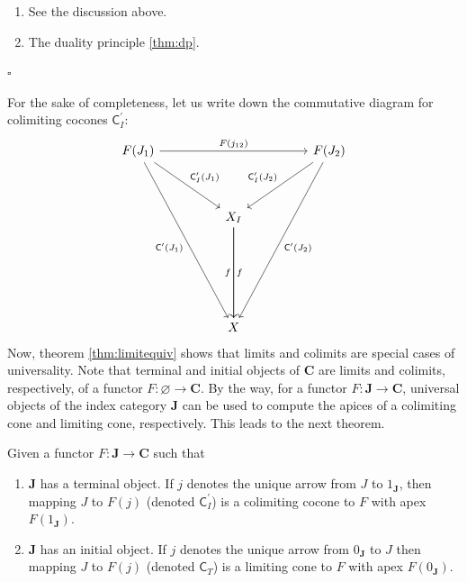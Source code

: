 \begin{prf}
\begin{enumerate}
\item[(1T)]
See the discussion above.
\item[(1I)]
The duality principle \ref{thm:dp}.
\end{enumerate}
\phantom{proven}
\hfill
$\square$
\end{prf}
For the sake of completeness, let us write down the commutative diagram for colimiting cocones $\mathsf{C}_{I}^{\prime}$:
\[
\begin{tikzcd}[sep=huge]
  F(J_{1})
  \arrow{rr}{F(j_{12})}
  \arrow{dr}{\mathsf{C}_{I}^{\prime}(J_{1})}
  \arrow[swap]{dddr}{\mathsf{C}^{\prime}(J_{1})}
  &
  &
  F(J_{2})
  \arrow{dddl}{\mathsf{C}^{\prime}(J_{2})}
  \arrow[swap]{dl}{\mathsf{C}_{I}^{\prime}(J_{2})}
  \\
  &
  X_{I}
  \arrow{dd}{f}
  \arrow[swap]{dd}{f}
  &
  \\
  \\
  &
  X
  &
\end{tikzcd}
\]
Now, theorem \ref{thm:limitequiv} shows that limits and colimits are special cases of universality.
Note that terminal and initial objects of $\mathbf{C}$ are limits and colimits, respectively, of a functor $F \colon \varnothing \rightarrow \mathbf{C}$.
By the way, for a functor $F \colon \mathbf{J} \rightarrow \mathbf{C}$, universal objects of the index category $\mathbf{J}$ can be used to compute the apices of a colimiting cone and limiting cone, respectively.
This leads to the next theorem.
\\
\begin{thm}
\label{thm:limonuniob}
Given a functor $F \colon \mathbf{J} \rightarrow \mathbf{C}$ such that
\begin{enumerate}
\item[(1T)]
$\mathbf{J}$ has a terminal object.
If $j$ denotes the unique arrow from $J$ to $1_{\mathbf{J}}$, then mapping $J$ to $F(j)$ (denoted $\mathsf{C}_{I}^{\prime}$) is a colimiting cocone to $F$ with apex $F(1_{\mathbf{J}})$.
\item[(1I)]
$\mathbf{J}$ has an initial object.
If $j$ denotes the unique arrow from $0_{\mathbf{J}}$ to $J$ then mapping $J$ to $F(j)$ (denoted $\mathsf{C}_{T}$) is a limiting cone to $F$ with apex $F(0_{\mathbf{J}})$.
\end{enumerate}
\end{thm}
